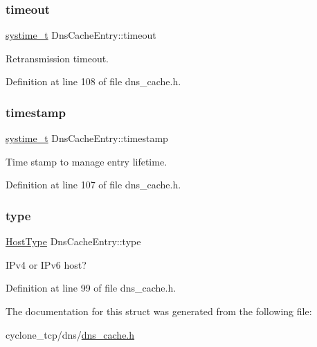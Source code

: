 \subsubsection{\texorpdfstring{timeout}{timeout}}
{\footnotesize\ttfamily \hyperlink{compiler__port_8h_ae3e32a98d431a02106616da3071832dd}{systime\+\_\+t} Dns\+Cache\+Entry\+::timeout}



Retransmission timeout. 



Definition at line 108 of file dns\+\_\+cache.\+h.

\mbox{\label{structDnsCacheEntry_ae149514d2ade99ae033ecedd03a5daf0}} 
\subsubsection{\texorpdfstring{timestamp}{timestamp}}
{\footnotesize\ttfamily \hyperlink{compiler__port_8h_ae3e32a98d431a02106616da3071832dd}{systime\+\_\+t} Dns\+Cache\+Entry\+::timestamp}



Time stamp to manage entry lifetime. 



Definition at line 107 of file dns\+\_\+cache.\+h.

\mbox{\label{structDnsCacheEntry_a5520082c9b81d8244f858641785ac01e}} 
\subsubsection{\texorpdfstring{type}{type}}
{\footnotesize\ttfamily \hyperlink{socket_8h_ab5e32e6fb9dfb43706584ab98de9a7bd}{Host\+Type} Dns\+Cache\+Entry\+::type}



I\+Pv4 or I\+Pv6 host? 



Definition at line 99 of file dns\+\_\+cache.\+h.



The documentation for this struct was generated from the following file\+:\begin{DoxyCompactItemize}
\item 
cyclone\+\_\+tcp/dns/\hyperlink{dns__cache_8h}{dns\+\_\+cache.\+h}\end{DoxyCompactItemize}
